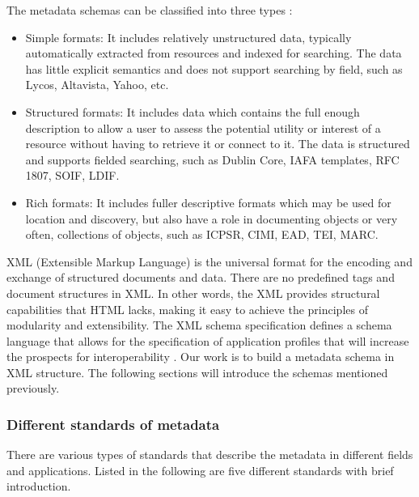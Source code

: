 The metadata schemas can be classified into three types \cite{dempsey1997specification}:
\begin{itemize}
	\item Simple formats: It includes relatively unstructured data, typically automatically extracted from resources and indexed for searching. 
	The data has little explicit semantics and does not support searching by field, such as Lycos, Altavista, Yahoo, etc.
	\item Structured formats: It includes data which contains the full enough description to allow a user to assess the potential utility or interest of a resource without having to retrieve it or connect to it. 
	The data is structured and supports fielded searching, such as Dublin Core, IAFA templates, RFC 1807, SOIF, LDIF.
	\item Rich formats: It includes fuller descriptive formats which may be used for location and discovery, 
	but also have a role in documenting objects or very often, collections of objects, such as ICPSR, CIMI, EAD, TEI, MARC.
\end{itemize}

XML (Extensible Markup Language) is the universal format for the encoding and exchange of structured documents and data. 
There are no predefined tags and document structures in XML. 
In other words, the XML provides structural capabilities that HTML lacks, making it easy to achieve the principles of modularity and extensibility. 
The XML schema specification defines a schema language that allows for the specification of application profiles that will increase the prospects for interoperability \cite{duval2002metadata}. 
Our work is to build a metadata schema in XML structure. The following sections will introduce the schemas mentioned previously.



\subsubsection*{Different standards of metadata}
\label{sec:mets}
There are various types of standards that describe the metadata in different fields and applications. 
Listed in the following are five different standards with brief introduction.

